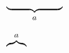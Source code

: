 \documentclass{article}
\begin{document}
$\underbrace{\makebox[1.8cm]{}}_a$


$\overbrace{\makebox[18pt]{}}^a$

\end{document}
